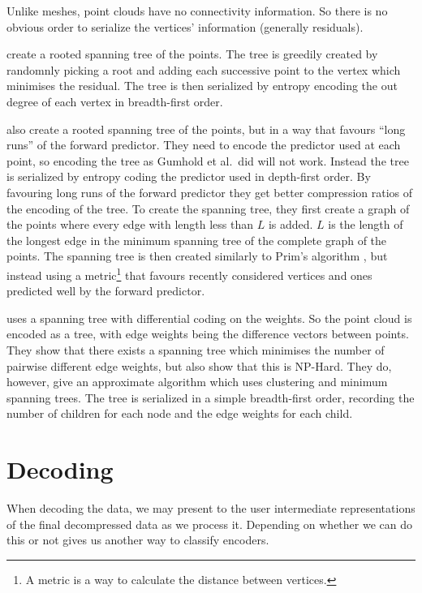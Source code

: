 \documentclass{report}
\begin{document}
Unlike meshes, point clouds have no connectivity information. So there is no
obvious order to serialize the vertices' information (generally residuals).

\citet{gumholdcomp} create a rooted spanning tree of the points. The tree is
greedily created by randomnly picking a root and adding each successive point
to the vertex which minimises the residual. The tree is then serialized by
entropy encoding the out degree of each vertex in breadth-first order.

\citet{merrycomp} also create a rooted spanning tree of the points, but in a
way that favours ``long runs'' of the forward predictor. They need to encode
the predictor used at each point, so encoding the tree as Gumhold et al.\ did
will not work. Instead the tree is serialized by entropy coding the predictor
used in depth-first order. By favouring long runs of the forward predictor
they get better compression ratios of the encoding of the tree. To create the
spanning tree, they first create a graph of the points where every edge with
length less than $L$ is added. $L$ is the length of the longest edge in the
minimum spanning tree of the complete graph of the points. The spanning tree
is then created similarly to Prim's algorithm \citep[p.\ 457]{sedgewick}, but
instead using a metric\footnote{A metric is a way to calculate the distance
  between vertices.} that favours recently considered vertices and ones
predicted well by the forward predictor.

\citet{chen2005lcp} uses a spanning tree with differential coding on the
weights. So the point cloud is encoded as a tree, with edge weights being the
difference vectors between points. They show that there exists a spanning tree
which minimises the number of pairwise different edge weights, but also show
that this is NP-Hard. They do, however, give an approximate algorithm which
uses clustering and minimum spanning trees. The tree is serialized in a simple
breadth-first order, recording the number of children for each node and the
edge weights for each child.


\section{Decoding}

When decoding the data, we may present to the user intermediate
representations of the final decompressed data as we process it. Depending on
whether we can do this or not gives us another way to classify encoders.
\end{document}
